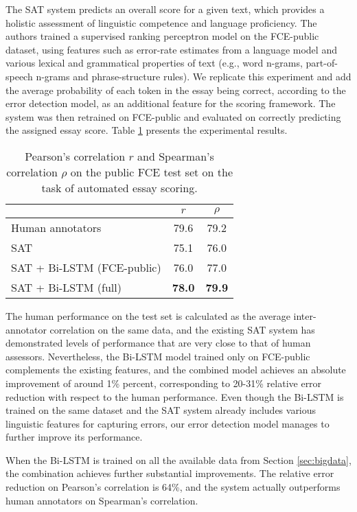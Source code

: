 \documentclass[11pt]{article}
\begin{document}
The SAT system predicts an overall score for a given text, which provides a holistic assessment of linguistic competence and language proficiency. The authors trained a supervised ranking perceptron model on the FCE-public dataset, using features such as error-rate estimates from a language model and various lexical and grammatical properties of text (e.g., word n-grams, part-of-speech n-grams and phrase-structure rules).
We replicate this experiment and add the average probability of each token in the essay being correct, according to the error detection model, as an additional feature for the scoring framework.
The system was then retrained on FCE-public and evaluated on correctly predicting the assigned essay score. 
Table \ref{tab:results_script} presents the experimental results. 

\begin{table}[h]
\centering
\begin{tabular}{lcc} \toprule
& $r$ & $\rho$ \\ \midrule
Human annotators & 79.6 & 79.2 \\
SAT & 75.1 & 76.0 \\
SAT + Bi-LSTM (FCE-public) & 76.0 & 77.0 \\
SAT + Bi-LSTM (full) & \textbf{78.0} & \textbf{79.9} \\ \bottomrule
\end{tabular}
\caption{Pearson's correlation $r$  and Spearman's correlation $\rho$ on the public FCE test set on the task of automated essay scoring.}
\label{tab:results_script}
\end{table}

The human performance on the test set is calculated as the average inter-annotator correlation on the same data, and the existing SAT system has demonstrated levels of performance that are very close to that of human assessors.
Nevertheless, the Bi-LSTM model trained only on FCE-public complements the existing features, and the combined model achieves an absolute improvement of around 1\% percent, corresponding to 20-31\% relative error reduction with respect to the human performance.
Even though the Bi-LSTM is trained on the same dataset and the SAT system already includes various linguistic features for capturing errors, our error detection model manages to further improve its performance.

When the Bi-LSTM is trained on all the available data from Section \ref{sec:bigdata}, the combination achieves further substantial improvements. The relative error reduction on Pearson's correlation is 64\%, and the system actually outperforms human annotators on Spearman's correlation.
\end{document}

